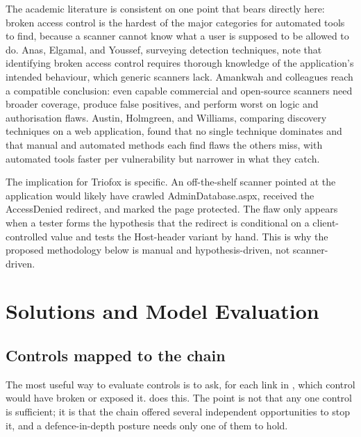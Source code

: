 \documentclass[11pt,a4paper]{article}
\newcommand{\code}[1]{{\small\ttfamily #1}}
\begin{document}
The academic literature is consistent on one point that bears directly here: broken access control is the hardest of the major categories for automated tools to find, because a scanner cannot know what a user is supposed to be allowed to do. Anas, Elgamal, and Youssef, surveying detection techniques, note that identifying broken access control requires thorough knowledge of the application's intended behaviour, which generic scanners lack. Amankwah and colleagues reach a compatible conclusion: even capable commercial and open-source scanners need broader coverage, produce false positives, and perform worst on logic and authorisation flaws. Austin, Holmgreen, and Williams, comparing discovery techniques on a web application, found that no single technique dominates and that manual and automated methods each find flaws the others miss, with automated tools faster per vulnerability but narrower in what they catch.

The implication for Triofox is specific. An off-the-shelf scanner pointed at the application would likely have crawled \code{AdminDatabase.aspx}, received the \code{AccessDenied} redirect, and marked the page protected. The flaw only appears when a tester forms the hypothesis that the redirect is conditional on a client-controlled value and tests the \code{Host}-header variant by hand. This is why the proposed methodology below is manual and hypothesis-driven, not scanner-driven.

\section{Solutions and Model Evaluation}

\subsection{Controls mapped to the chain}

The most useful way to evaluate controls is to ask, for each link in , which control would have broken or exposed it.  does this. The point is not that any one control is sufficient; it is that the chain offered several independent opportunities to stop it, and a defence-in-depth posture needs only one of them to hold.
\end{document}
